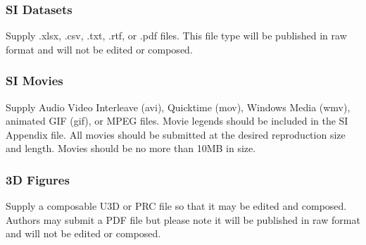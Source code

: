 \documentclass[9pt,twocolumn,twoside,lineno]{pnas-new}
\begin{document}
\subsubsection*{SI Datasets} 

Supply .xlsx, .csv, .txt, .rtf, or .pdf files. This file type will be published in raw format and will not be edited or composed.


\subsubsection*{SI Movies}

Supply Audio Video Interleave (avi), Quicktime (mov), Windows Media (wmv), animated GIF (gif), or MPEG files. Movie legends should be included in the SI Appendix file. All movies should be submitted at the desired reproduction size and length. Movies should be no more than 10MB in size.


\subsubsection*{3D Figures}

Supply a composable U3D or PRC file so that it may be edited and composed. Authors may submit a PDF file but please note it will be published in raw format and will not be edited or composed.



\showmatmethods{} %


\showacknow{} %


\end{document}
